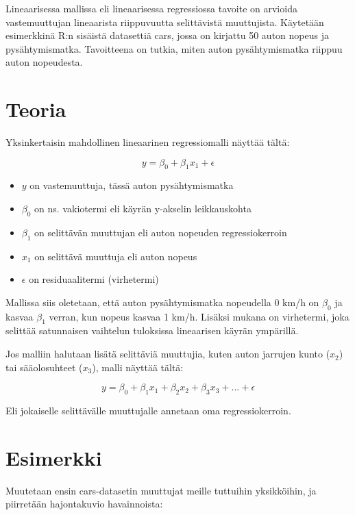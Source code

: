 \documentclass[
]{book}
\providecommand{\tightlist}{%
  \setlength{\itemsep}{0pt}\setlength{\parskip}{0pt}}
\begin{document}
Lineaarisessa mallissa eli lineaarisessa regressiossa tavoite on arvioida vastemuuttujan lineaarista riippuvuutta selittävistä muuttujista. Käytetään esimerkkinä R:n sisäistä datasettiä cars, jossa on kirjattu 50 auton nopeus ja pysähtymismatka. Tavoitteena on tutkia, miten auton pysähtymismatka riippuu auton nopeudesta.

\hypertarget{teoria}{%
\section{Teoria}\label{teoria}}

Yksinkertaisin mahdollinen lineaarinen regressiomalli näyttää tältä:

\[y = \beta_0 + \beta_1 x_1 + \epsilon\]

\begin{itemize}
\tightlist
\item
  \(y\) on vastemuuttuja, tässä auton pysähtymismatka
\item
  \(\beta_0\) on ns. vakiotermi eli käyrän y-akselin leikkauskohta
\item
  \(\beta_1\) on selittävän muuttujan eli auton nopeuden regressiokerroin
\item
  \(x_1\) on selittävä muuttuja eli auton nopeus
\item
  \(\epsilon\) on residuaalitermi (virhetermi)
\end{itemize}

Mallissa siis oletetaan, että auton pysähtymismatka nopeudella 0 km/h on \(\beta_0\) ja kasvaa \(\beta_1\) verran, kun nopeus kasvaa 1 km/h. Lisäksi mukana on virhetermi, joka selittää satunnaisen vaihtelun tuloksissa lineaarisen käyrän ympärillä.

Jos malliin halutaan lisätä selittäviä muuttujia, kuten auton jarrujen kunto (\(x_2\)) tai sääolosuhteet (\(x_3\)), malli näyttää tältä:

\[y = \beta_0 + \beta_1 x_1 + \beta_2 x_2 + \beta_3 x_3 + ... + \epsilon\]

Eli jokaiselle selittävälle muuttujalle annetaan oma regressiokerroin.

\hypertarget{esimerkki}{%
\section{Esimerkki}\label{esimerkki}}

Muutetaan ensin cars-datasetin muuttujat meille tuttuihin yksikköihin, ja piirretään hajontakuvio havainnoista:
\end{document}
